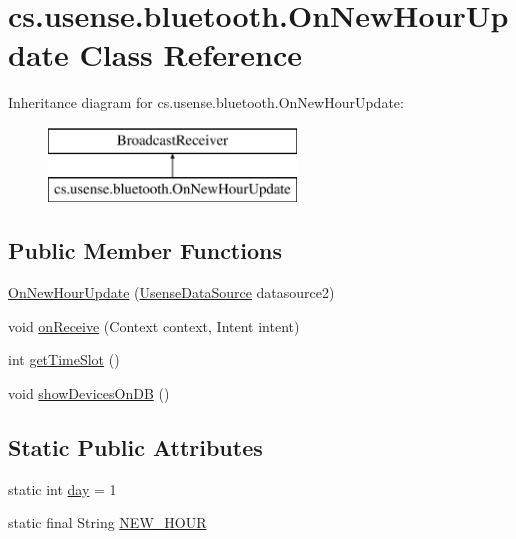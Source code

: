 \hypertarget{classcs_1_1usense_1_1bluetooth_1_1_on_new_hour_update}{}\section{cs.\+usense.\+bluetooth.\+On\+New\+Hour\+Update Class Reference}
\label{classcs_1_1usense_1_1bluetooth_1_1_on_new_hour_update}
Inheritance diagram for cs.\+usense.\+bluetooth.\+On\+New\+Hour\+Update\+:\begin{figure}[H]
\begin{center}
\leavevmode
\includegraphics[height=2.000000cm]{classcs_1_1usense_1_1bluetooth_1_1_on_new_hour_update}
\end{center}
\end{figure}
\subsection*{Public Member Functions}
\begin{DoxyCompactItemize}
\item 
\hyperlink{classcs_1_1usense_1_1bluetooth_1_1_on_new_hour_update_af5363cd149e80b1b4abbeb44a0251e4e}{On\+New\+Hour\+Update} (\hyperlink{classcs_1_1usense_1_1db_1_1_usense_data_source}{Usense\+Data\+Source} datasource2)
\item 
void \hyperlink{classcs_1_1usense_1_1bluetooth_1_1_on_new_hour_update_ac238f8079381da35e6fe4cc08b09ff20}{on\+Receive} (Context context, Intent intent)
\item 
int \hyperlink{classcs_1_1usense_1_1bluetooth_1_1_on_new_hour_update_a631338f7e73961f53f62a85e46350c74}{get\+Time\+Slot} ()
\item 
void \hyperlink{classcs_1_1usense_1_1bluetooth_1_1_on_new_hour_update_adfe6b0c83611152834e2196651d19948}{show\+Devices\+On\+D\+B} ()
\end{DoxyCompactItemize}
\subsection*{Static Public Attributes}
\begin{DoxyCompactItemize}
\item 
static int \hyperlink{classcs_1_1usense_1_1bluetooth_1_1_on_new_hour_update_a7843bdaadcf923564765c6a3e5f2941d}{day} = 1
\item 
static final String \hyperlink{classcs_1_1usense_1_1bluetooth_1_1_on_new_hour_update_aa896ac5cee7c10c70a6f9159bf7c8ec4}{N\+E\+W\+\_\+\+H\+O\+U\+R}
\end{DoxyCompactItemize}
